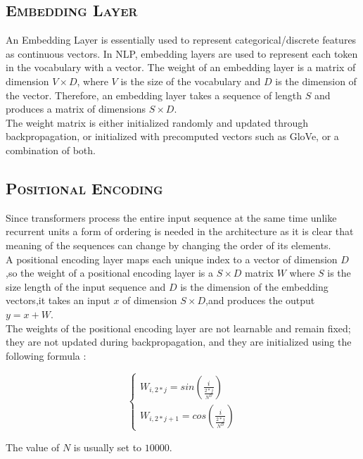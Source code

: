\documentclass[a4paper,10pt]{article}
\begin{document}
\subsection{\scshape{Embedding Layer}}

\noindent An Embedding Layer is essentially used to represent categorical/discrete features as continuous vectors. In NLP, embedding layers are used to represent each token in the vocabulary with a vector. The weight of an embedding layer is a matrix of dimension 
$V \times D$, where $V$ is the size of the vocabulary and $D$ is the dimension of the vector. Therefore, an embedding layer takes a sequence of length $S$ and produces a matrix of dimensions $S \times D$.\\

\noindent The weight matrix is either initialized randomly and updated through backpropagation, or initialized with precomputed vectors such as GloVe, or a combination of both.

\newpage
\subsection{\scshape{Positional Encoding}}

\noindent Since transformers process the entire input sequence at the same time unlike recurrent units a form of ordering is needed in the architecture as it is clear that meaning of the sequences can change by changing the order of its elements.\\

\noindent A positional encoding layer maps each unique index to a vector of dimension $D$,so the weight of a positional encoding layer is a $S \times D$ matrix $W$ where $S$ is the size length of the input sequence and $D$ is the dimension of the embedding vectors,it takes an input $x$ of dimension $S \times D$,and produces the output $y = x + W$.\\

\noindent The weights of the positional encoding layer are not learnable and remain fixed; they are not updated during backpropagation, and they are initialized using the following formula :

$$
\begin{cases}
    W_{i,2 * j} = sin(\frac{i}{\frac{2 * j}{N^D}}) \\
    W_{i,2 * j + 1} = cos(\frac{i}{\frac{2 * j}{N^D}})
\end{cases}
$$

\noindent The value of $N$ is usually set to $10000$.
\end{document}
